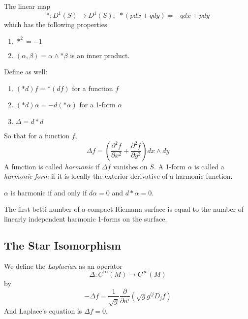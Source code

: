 \begin{defn}

The linear map
\[
	*:D^1(S) \to D^1(S); \hspace{4pt} *(p dx + q dy) = -q dx + p dy
\]
which has the following properties
\begin{enumerate}
	\item $ *^2 = -1$
	\item $ \left( \alpha, \beta \right) = \alpha \wedge * \beta$ is an inner product.
\end{enumerate}
Define as well:
\begin{enumerate}
	\item $(*d)f = * (df)$ for a function $f$
	\item $ (*d) \alpha = - d( * \alpha)$ for a 1-form $ \alpha$
	\item $ \Delta = d*d$
\end{enumerate}
So that for a function $f$,
\[
	\Delta f = \left( \frac{ \partial^2 f}{\partial x^2 } + \frac{ \partial^2 f}{\partial y^2 }  \right) dx \wedge dy
\]
A function is called \textit{harmonic} if $ \Delta f$ vanishes on $S$. A 1-form $ \alpha$ is called a \textit{harmonic form} if it is locally the exterior derivative of a harmonic function.
\end{defn}

\begin{prop}

$ \alpha$ is harmonic if and only if $d \alpha = 0$ and $ d * \alpha = 0$.

\end{prop}

\begin{thm}

	The first betti number of a compact Riemann surface is equal to the number of linearly independent harmonic 1-forms on the surface.

\end{thm}

\subsection{The Star Isomorphism}
\begin{defn}

We define the \textit{Laplacian} as an operator
\[
\Delta: C^{\infty}( M ) \to C^{\infty}( M ) 
\]
by 
\[
	- \Delta f = \frac{1}{ \sqrt{g}} \frac{ \partial }{\partial u^i } \left( \sqrt{g} g^{ ij } D_j f \right)
\]
And Laplace's equation is $ \Delta f = 0$.

\end{defn}

